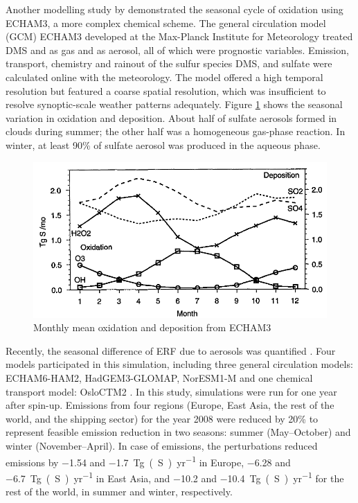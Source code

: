 Another modelling study by \citet{feichterSimulationTroposphericSulfur1996} demonstrated the seasonal cycle of  oxidation using ECHAM3, a more complex chemical scheme. The general circulation model (GCM) ECHAM3 developed at the Max-Planck Institute for Meteorology treated DMS and  as gas and  as aerosol, all of which were prognostic variables. Emission, transport, chemistry and rainout of the sulfur species DMS,  and sulfate were calculated online with the meteorology. The model offered a high temporal resolution but featured a coarse spatial resolution, which was insufficient to resolve synoptic-scale weather patterns adequately. Figure \ref{fig:ch4:feichter1996} shows the seasonal variation in  oxidation and deposition. About half of sulfate aerosols formed in clouds during summer; the other half was a homogeneous gas-phase reaction. In winter, at least 90\% of sulfate aerosol was produced in the aqueous phase.


\begin{figure}
    \centering
    \includegraphics[width=0.8\linewidth]{Chapter4/Figs/feitcher1996.png}
    \caption{Monthly mean  oxidation and deposition from ECHAM3 \citep{feichterSimulationTroposphericSulfur1996}}
    \label{fig:ch4:feichter1996}
\end{figure}


Recently, the seasonal difference of ERF due to aerosols was quantified \citep{bellouinRegionalSeasonalRadiative2016}. Four models participated in this simulation, including three general circulation models: ECHAM6-HAM2, HadGEM3-GLOMAP, NorESM1-M and one chemical transport model: OsloCTM2 . In this study, simulations were run for one year after spin-up. Emissions from four regions (Europe, East Asia, the rest of the world, and the shipping sector) for the year 2008 were reduced by 20\%  to represent feasible emission reduction in two seasons: summer (May--October) and winter (November--April). In case of  emissions, the perturbations reduced  emissions by \num{-1.54} and \qty{-1.7}{Tg(S)~yr^{-1}} in Europe, \num{-6.28} and \qty{-6.7}{Tg(S)~yr^{-1}} in East Asia, and \num{-10.2} and \qty{-10.4}{Tg(S)~yr^{-1}} for the rest of the world, in summer and winter, respectively.

